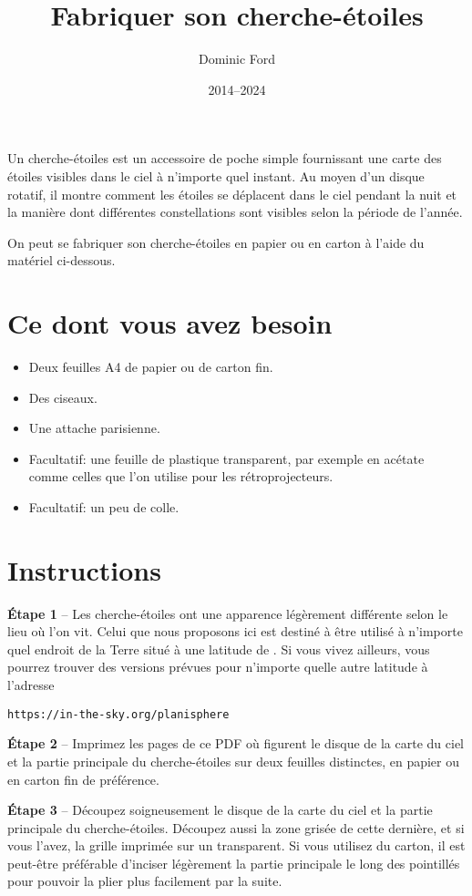 \documentclass[a4paper,onecolumn,10pt]{article}
\title{Fabriquer son cherche-étoiles}
\author{Dominic Ford}
\date{2014--2024}
\begin{document}
\maketitle
\setcounter{footnote}{1}

Un cherche-étoiles est un accessoire de poche simple fournissant une carte des étoiles visibles dans le ciel à n’importe quel instant. Au moyen d’un disque rotatif, il montre comment les étoiles se déplacent dans le ciel pendant la nuit et la manière dont différentes constellations sont visibles selon la période de l’année.

On peut se fabriquer son cherche-étoiles en papier ou en carton à l’aide du matériel ci-dessous.

\section*{Ce dont vous avez besoin}

\begin{itemize}
\item Deux feuilles A4 de papier ou de carton fin.
\item Des ciseaux.
\item Une attache parisienne.
\item Facultatif: une feuille de plastique transparent, par exemple en acétate comme celles que l’on utilise pour les rétroprojecteurs.
\item Facultatif: un peu de colle.
\end{itemize}

\section*{Instructions}

{\bf Étape 1} -- Les cherche-étoiles ont une apparence légèrement différente selon le lieu où l’on vit. Celui que nous proposons ici est destiné à être utilisé à n’importe quel endroit de la Terre situé à une latitude de . Si vous vivez ailleurs, vous pourrez trouver des versions prévues pour n’importe quelle autre latitude à l’adresse

\centerline{\tt https://in-the-sky.org/planisphere}

{\bf Étape 2} -- Imprimez les pages de ce PDF où figurent le disque de la carte du ciel et la partie principale du cherche-étoiles sur deux feuilles distinctes, en papier ou en carton fin de préférence.

{\bf Étape 3} -- Découpez soigneusement le disque de la carte du ciel et la partie principale du cherche-étoiles. Découpez aussi la zone grisée de cette dernière, et si vous l’avez, la grille imprimée sur un transparent. Si vous utilisez du carton, il est peut-être préférable d’inciser légèrement la partie principale le long des pointillés pour pouvoir la plier plus facilement par la suite.
\end{document}
